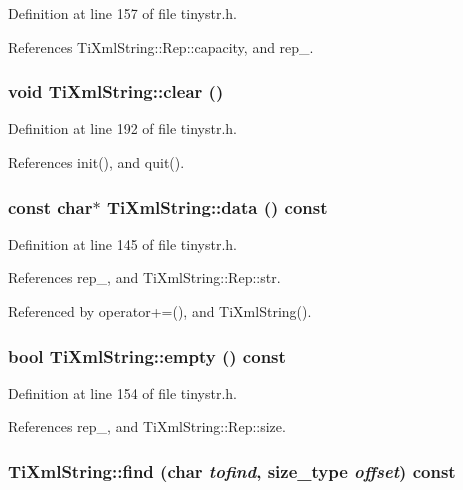 Definition at line 157 of file tinystr.h.

References TiXmlString::Rep::capacity, and rep\_\-.\hypertarget{class_ti_xml_string_ab20e06e4c666abf3bdbfb3a1191d4888}{
\subsubsection[{clear}]{\setlength{\rightskip}{0pt plus 5cm}void TiXmlString::clear ()}}
\label{class_ti_xml_string_ab20e06e4c666abf3bdbfb3a1191d4888}


Definition at line 192 of file tinystr.h.

References init(), and quit().\hypertarget{class_ti_xml_string_a00abc60f135c7ca1951c7334cc2c7993}{
\subsubsection[{data}]{\setlength{\rightskip}{0pt plus 5cm}const char$\ast$ TiXmlString::data () const}}
\label{class_ti_xml_string_a00abc60f135c7ca1951c7334cc2c7993}


Definition at line 145 of file tinystr.h.

References rep\_\-, and TiXmlString::Rep::str.

Referenced by operator+=(), and TiXmlString().\hypertarget{class_ti_xml_string_a9a61e1d11cdb71bea4a4ed79caa793f4}{
\subsubsection[{empty}]{\setlength{\rightskip}{0pt plus 5cm}bool TiXmlString::empty () const}}
\label{class_ti_xml_string_a9a61e1d11cdb71bea4a4ed79caa793f4}


Definition at line 154 of file tinystr.h.

References rep\_\-, and TiXmlString::Rep::size.\hypertarget{class_ti_xml_string_a5f2a6fd565751410b392f249a9786db4}{
\subsubsection[{find}]{ TiXmlString::find (char {\em tofind}, \/  {\bf size\_\-type} {\em offset}) const}}
\label{class_ti_xml_string_a5f2a6fd565751410b392f249a9786db4}


